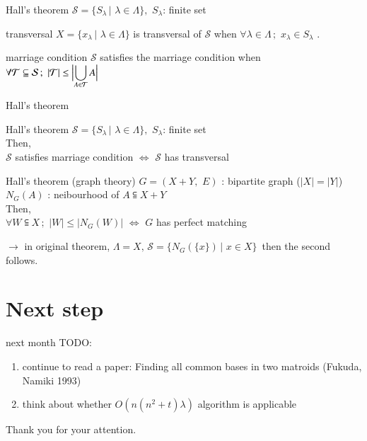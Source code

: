 \documentclass[11pt,xcolor=dvipsnames,table,dvipdfmx]{beamer}
\begin{document}
\begin{frame}{Hall's theorem}
 $\mathcal{S} = \{S_\lambda\,|\,\,\lambda \in \Lambda\},\,\,S_\lambda$: finite set \\
 \vspace{0.5cm}
 \begin{block}{transversal}
  $X = \{x_\lambda\,|\,\,\lambda \in \Lambda\}$ is \alert{transversal} of $\mathcal{S}$ when $\forall \lambda \in \Lambda \,;\,\,x_\lambda \in S_\lambda$ .
 \end{block}
 \begin{block}{marriage condition}
  $\mathcal{S}$ satisfies the \alert{marriage condition} when \\
  $\forall \mathcal{T} \subseteqq \mathcal{S}\,;\,\,|\mathcal{T}| \leq {\Bigl |}{\displaystyle \bigcup_{A\in \mathcal{T}}A}{\Bigr |}$
 \end{block}
\end{frame}


\begin{frame}{Hall's theorem}
 \begin{block}{Hall's theorem}
  $\mathcal{S} = \{S_\lambda\,|\,\,\lambda \in \Lambda\},\,\,S_\lambda$: finite set \\
  Then, \\ $\mathcal{S}$ satisfies marriage condition $\iff$ $\mathcal{S}$ has transversal
 \end{block}
 \begin{block}{Hall's theorem (graph theory)}
  $G = (X + Y,\,\,E)$ : bipartite graph ($|X| = |Y|$)\\
  $N_G (A)$ : neibourhood of $A \subseteqq X + Y$ \\
  Then, \\ $\forall W \subseteqq X\,;\,\,|W| \leq |N_G (W)|$  $\iff$ $G$ has perfect matching
 \end{block}
 $\rightarrow$ in original theorem, $\Lambda = X,\,\mathcal{S} = \{N_G (\{x\})\,|\,\,x \in X\}\,$ then the second follows.
\end{frame}


\section{Next step}
\begin{frame}{next month}
 TODO:
 \begin{enumerate}
  \item continue to read a paper: Finding all common bases in two matroids (Fukuda, Namiki 1993)
  \item think about whether $O(n(n^2 + t)\lambda)$ algorithm is applicable
 \end{enumerate}
\end{frame}

\begin{frame}
 \begin{center}
  Thank you for your attention.
 \end{center}
\end{frame}
\end{document}
